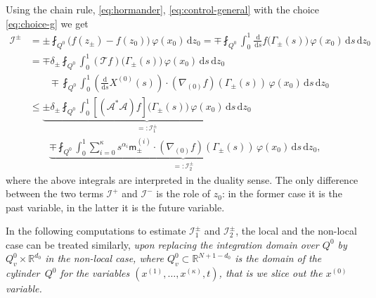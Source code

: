 \documentclass[10pt]{amsart}
\theoremstyle{definition}
\newcommand\R{{\mathbb R}}
\newcommand{\cI}{{\mathcal I}}
\newcommand\ds{{\frac{\mathrm d}{\mathrm ds}}}
\newcommand{\dd}{{\, \mathrm d}}
\begin{document}
Using the chain rule, \eqref{eq:hormander},
\eqref{eq:control-general} with the choice \eqref{eq:choice-g} we
get
\begin{equation}
\label{eq:I1-I2}
\begin{aligned}
\cI^\pm & = \pm \fint_{Q^0} \Big(f(z_\pm) -
f(z_0)\Big) \, \varphi(x_0) \dd z_0  = \mp \fint_{Q^0} \int_0^1 \frac{\dd}{\dd
s}f\big(\Gamma_\pm(s)\big) \, \varphi(x_0)\dd s\dd z_0 \\
& = \mp\delta_\pm \fint_{Q^0} \int_0^1 \left(\mathcal T
f \right)\big(\Gamma_\pm(s)\big) \, \varphi(x_0)\dd s\dd z_0 \\
& \qquad \mp \fint_{Q^0} \int_0^1 \left(\ds X^{(0)}(s) \right)
\cdot \left(\nabla_{(0)} f\right)(\Gamma_\pm(s)) \, \varphi(x_0)\dd s \dd
z_0 \\
& \leq \underbrace{\pm\delta_\pm \fint_{Q^0} \int_0^1
\left[ \left(\mathcal A^* \mathcal A \right) f\right]
\big(\Gamma_\pm(s)\big) \, \varphi(x_0)\dd s\dd z_0}_{=:
\cI^\pm_1} \\
& \qquad \underbrace{\mp\fint_{Q^0} \int_0^1 \sum_{i =
0}^\kappa s^{\alpha_i} \mathsf m_\pm^{(i)}
\cdot \left(\nabla_{(0)} f \right)(\Gamma_\pm(s)) \,
\varphi(x_0)\dd s \dd z_0}_{=: \cI^\pm_2},
\end{aligned}
\end{equation}
where the above integrals are interpreted in the duality sense. The only difference between the two terms $\cI^+$ and
$\cI^-$ is the role of $z_0$: in the former case it is the past
variable, in the latter it is the future variable.

In the following computations to estimate $\mathcal I_1^\pm$ and $\mathcal I_2^\pm$,
the local and the non-local case can be treated similarly,
\textit{upon replacing the integration domain over $Q^0$
by \hbox{$Q^0_v \times \R^{d_0}$} in the non-local case,
where $Q^0_v \subset \R^{N + 1 - d_0}$ is the domain of the cylinder~$Q^0$
for the variables $(x^{(1)}, \dots, x^{(\kappa)}, t)$,
that is we slice out the $x^{(0)}$ variable.}
\end{document}
